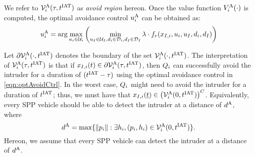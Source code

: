 We refer to $\mathcal{V}^{\text{A}}_i(\tau, t^\text{IAT})$ as \textit{avoid region} hereon. Once the value function $V^{\text{A}}_{i}(\cdot)$ is computed, the optimal avoidance control ${u^{\text{A}}_{i}}$ can be obtained as:
\begin{equation} \label{eqn:optAvoidCtrl}
{\ctrl^{\text{A}}_{i}} = \arg \max_{\ctrl_i \in \cset_i} \left( \min_{\ctrl_\intr \in \cset_\intr, \dstb_i \in \dset_i, \dstb_\intr \in \dset_\intr} \costate \cdot f_r(\state_{\intr, i}, \ctrl_i, \ctrl_\intr, \dstb_i, \dstb_\intr) \right)
\end{equation}

Let $\partial \mathcal{V}^{\text{A}}_{i}(\cdot, t^\text{IAT})$ denotes the boundary of the set $\mathcal{V}^{\text{A}}_{i}(\cdot, t^\text{IAT})$. The interpretation of $\mathcal{V}^{\text{A}}_{i}(\tau, t^\text{IAT})$ is that if $x_{I, i}(t) \in \partial \mathcal{V}^{\text{A}}_{i}(\tau, t^\text{IAT})$, then $Q_i$ can successfully avoid the intruder for a duration of $(t^\text{IAT} - \tau)$ using the optimal avoidance control in \eqref{eqn:optAvoidCtrl}. In the worst case, $Q_i$ might need to avoid the intruder for a duration of $t^\text{IAT}$; thus, we must have that  
$x_{I, i}(\underline{t}) \in \left(\mathcal{V}^{\text{A}}_{i}(0, t^\text{IAT})\right)^C$. Equivalently, every SPP vehicle should be able to detect the intruder at a distance of $d^\text{A}$, where
\begin{equation} \label{eqn:sen_distance}
\dsen = \max\{ \|p_i\|: \exists \npos_i, (p_i, \npos_i) \in \brs^{\text{A}}_{i}(0, \iat) \}.
\end{equation} 
Hereon, we assume that every SPP vehicle can detect the intruder at a distance of $d^\text{A}$.


